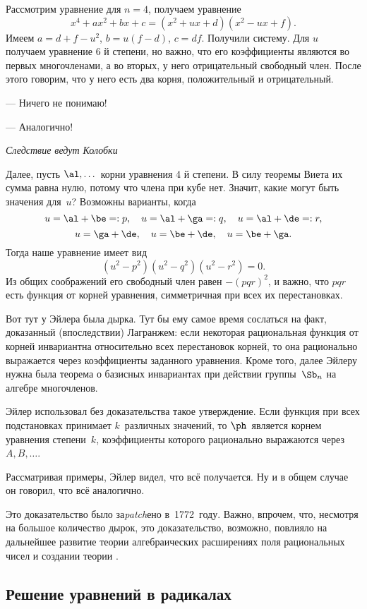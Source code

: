 \documentclass[a4paper,oneside,fleqn,10pt]{article}
\begin{document}
Рассмотрим уравнение для $n=4$, получаем уравнение
$$ x^4 + ax^2 + bx + c = (x^2 + ux + d) (x^2 - ux + f).
$$ Имеем $a = d + f - u^2$, $b = u(f-d)$, $c = df$.  Получили
систему. Для $u$ получаем уравнение 6 й степени, но важно, что его
коэффициенты являются во первых многочленами, а во вторых, у него
отрицательный свободный член.  После этого говорим, что у него есть
два корня, положительный и отрицательный.

\epigraph{\par--- Ничего не понимаю!  \par --- Аналогично!}
         {\emph{Следствие ведут Колобки}}

Далее, пусть $\al, \dots$ корни уравнения 4 й степени. В силу теоремы
Виета их сумма равна нулю, потому что члена при кубе нет. Значит,
какие могут быть значения для~$u$?  Возможны варианты, когда
$$ u = \al + \be =:p,\quad u = \al + \ga=:q,\quad u = \al + \de=:r,
$$
$$ u = \ga + \de,\quad u = \be + \de,\quad u = \be + \ga.$$ Тогда наше
уравнение имеет вид
$$ (u^2-p^2)(u^2-q^2)(u^2-r^2) = 0.
$$ Из общих соображений его свободный член равен $-(pqr)^2$, и важно,
что $pqr$ есть функция от корней уравнения, симметричная при всех их
перестановках.

Вот тут у Эйлера была дырка. Тут бы ему самое время сослаться на факт,
доказанный (впоследствии) Лагранжем: если некоторая рациональная
функция от корней инвариантна относительно всех перестановок корней,
то она рационально выражается через коэффициенты заданного уравнения.
Кроме того, далее Эйлеру нужна была теорема о базисных инвариантах при
действии группы~$\Sb_n$ на алгебре многочленов.

Эйлер использовал без доказательства такое утверждение.  Если функция
при всех подстановках принимает $k$~различных значений, то
$\ph$~является корнем уравнения степени~$k$, коэффициенты которого
рационально выражаются через $A, B, \dots$.

Рассматривая примеры, Эйлер видел, что всё получается. Ну и в общем
случае он говорил, что всё аналогично.

Это доказательство было за\emph{patch}ено 
в~1772~году.  Важно, впрочем, что, несмотря на большое количество
дырок, это доказательство, возможно, повлияло на дальнейшее развитие
теории алгебраических расширениях поля рациональных чисел и создании
теории .

\subsection{Решение уравнений в радикалах}
\end{document}
